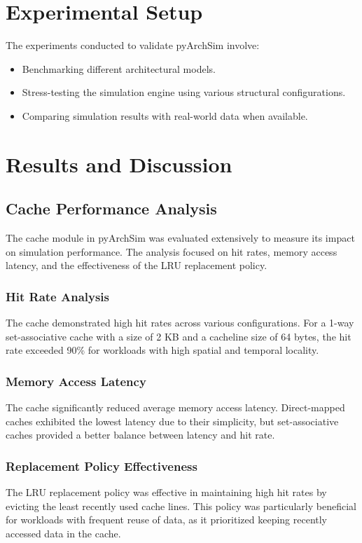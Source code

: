 \documentclass[12pt,a4paper]{report}
\begin{document}
\section{Experimental Setup}
The experiments conducted to validate pyArchSim involve:
\begin{itemize}
  \item Benchmarking different architectural models.
  \item Stress-testing the simulation engine using various structural configurations.
  \item Comparing simulation results with real-world data when available.
\end{itemize}

\section{Results and Discussion}
\subsection{Cache Performance Analysis}
The cache module in pyArchSim was evaluated extensively to measure its impact on simulation performance. The analysis focused on hit rates, memory access latency, and the effectiveness of the LRU replacement policy.

\subsubsection{Hit Rate Analysis}
The cache demonstrated high hit rates across various configurations. For a 1-way set-associative cache with a size of 2 KB and a cacheline size of 64 bytes, the hit rate exceeded 90\% for workloads with high spatial and temporal locality.

\subsubsection{Memory Access Latency}
The cache significantly reduced average memory access latency. Direct-mapped caches exhibited the lowest latency due to their simplicity, but set-associative caches provided a better balance between latency and hit rate.

\subsubsection{Replacement Policy Effectiveness}
The LRU replacement policy was effective in maintaining high hit rates by evicting the least recently used cache lines. This policy was particularly beneficial for workloads with frequent reuse of data, as it prioritized keeping recently accessed data in the cache.
\end{document}
